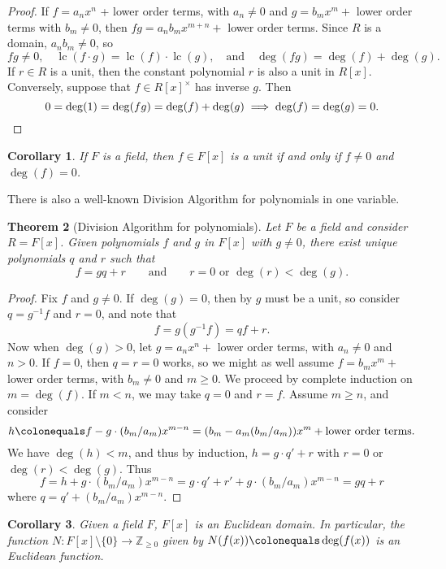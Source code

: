 \documentclass[12pt]{report}
\newtheorem{theorem}{Theorem}[chapter]
\newtheorem{corollary}[theorem]{Corollary}
\numberwithin{equation}{section}
\numberwithin{theorem}{chapter}
\theoremstyle{definition}
\newtheorem*{basic properties}{Basic Properties}
\newtheorem*{Important Remark}{Important Remark}
\DeclareMathOperator{\lc}{lc}
\begin{document}
\begin{proof}
If $f = a_n x^n$ + lower order terms, with $a_n \neq 0$ and $g =b_m x^m + $ lower order terms with $b_m \neq 0$, then $fg = a_n b_m x^{m+n} + $ lower order terms. 
Since $R$ is a domain, $a_n b_m \neq 0$, so
$$fg \neq 0, \quad \lc(f \cdot g) = \lc(f) \cdot \lc(g), \quad \text{and} \quad \deg(f g)=\deg(f)+\deg(g).$$
If $r \in R$ is a unit, then the constant polynomial $r$ is also a unit in $R[x]$. Conversely, suppose that $f \in R[x]^\times$ has inverse $g$. Then 
$$0 = \deg(1) = \deg(fg) = \deg(f) + \deg(g) \implies \deg(f) = \deg(g) = 0.\qedhere$$
\end{proof}


\begin{corollary}\label{units in F[x]}
	If $F$ is a field, then $f \in F[x]$ is a unit if and only if $f \neq 0$ and $\deg(f) = 0$.
\end{corollary}


There is also a well-known Division Algorithm for polynomials in one variable.


\begin{theorem}[Division Algorithm for polynomials]\label{division algorithm polynomials}
Let $F$ be a field and consider $R = F[x]$. Given polynomials $f$ and $g$ in $F[x]$ with $g \neq 0$, there exist unique polynomials $q$ and $r$ such that 
$$f = gq + r \qquad \text{and} \qquad r=0 \text{ or } \deg(r) < \deg(g).$$
\end{theorem}


\begin{proof}
Fix $f$ and $g \neq 0$.
If $\deg(g) = 0$, then by  $g$ must be a unit, so consider $q = g^{-1}f$ and $r = 0$, and note that
$$f = g(g^{-1}f) = qf+r.$$
Now when $\deg(g)>0$, let $g = a_nx^n + $ lower order terms, with $a_n \ne 0$ and $n > 0$. If $f = 0$, then $q=r=0$ works, so we might as well assume $f = b_m x^m + $ lower order terms, with $b_m \neq 0$ and $m \geqslant 0$.
We proceed by complete induction on $m = \deg(f)$. If $m < n$, we may take $q = 0$ and $r = f$. Assume $m \geqslant n$, and consider
$$h \colonequals f - g \cdot (b_m/a_m) x^{m- n} = (b_m - a_m(b_m/a_m)) x^m + \text{lower order terms}.$$
We have $\deg(h) < m$, and thus  by induction, $h = g \cdot q' + r$ with $r = 0$ or $\deg(r) < \deg(g)$. Thus
$$f = h + g \cdot (b_m/a_m) x^{m-n} =  g \cdot q' + r' + g \cdot (b_m/a_m) x^{m-n} = g q + r$$
where $q = q' + (b_m/a_m) x^{m-n}$.
\end{proof}

\begin{corollary}\label{F[x] is an euclidean domain}
Given a field $F$, $F[x]$ is an Euclidean domain. In particular, the function $N\!: F[x] \setminus \{ 0 \} \longrightarrow \mathbb{Z}_{\geqslant 0}$ given by $N(f(x)) \colonequals \deg(f(x))$ is an Euclidean function.
\end{corollary}
\end{document}
